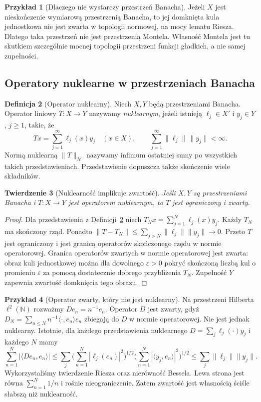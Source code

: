 \documentclass[11pt,a4paper]{article}
\numberwithin{equation}{section}
\theoremstyle{plain}
\newtheorem{twierdzenie}{Twierdzenie}[section]
\theoremstyle{definition}
\newtheorem{definicja}[twierdzenie]{Definicja}
\newtheorem{przyklad}[twierdzenie]{Przykład}
\theoremstyle{remark}
\newcommand{\N}{\mathbb N}
\begin{document}
\begin{przyklad}[Dlaczego nie wystarczy przestrzeń Banacha]
\label{ex:banach-not-montel23}
Jeżeli $X$ jest nieskończenie wymiarową przestrzenią Banacha,
to jej domknięta kula jednostkowa nie jest zwarta w topologii
normowej, na mocy lematu Riesza. Dlatego taka przestrzeń
nie jest przestrzenią Montela. Własność Montela
jest tu skutkiem szczególnie mocnej topologii przestrzeni
funkcji gładkich, a nie samej zupełności.
\end{przyklad}

\subsection{Operatory nuklearne w przestrzeniach Banacha}

\begin{definicja}[Operator nuklearny]
\label{def:nuclear-banach23}
Niech $X,Y$ będą przestrzeniami Banacha. Operator liniowy
$T:X\to Y$ nazywamy \emph{nuklearnym}, jeżeli istnieją
$\ell_j\in X'$ i $y_j\in Y$, $j\ge1$, takie, że
\[
 Tx=\sum_{j=1}^\infty \ell_j(x)y_j\quad(x\in X),
 \qquad \sum_{j=1}^\infty\|\ell_j\|\,\|y_j\|<\infty.
\]
Normą nuklearną $\|T\|_{\mathcal N}$ nazywamy infimum
ostatniej sumy po wszystkich takich przedstawieniach.
Przedstawienie dopuszcza także skończenie wiele składników.
\end{definicja}

\begin{twierdzenie}[Nuklearność implikuje zwartość]
\label{thm:nuclear-compact23}
Jeśli $X,Y$ są przestrzeniami Banacha i $T:X\to Y$
jest operatorem nuklearnym, to $T$ jest ograniczony i zwarty.
\end{twierdzenie}
\begin{proof}
Dla przedstawienia z Definicji~\ref{def:nuclear-banach23}
niech $T_Nx=\sum_{j=1}^N\ell_j(x)y_j$.
Każdy $T_N$ ma skończony rząd. Ponadto
$\|T-T_N\|\le\sum_{j>N}\|\ell_j\|\|y_j\|\to0$.
Przeto $T$ jest ograniczony i jest granicą operatorów
skończonego rzędu w normie operatorowej. Granica
operatorów zwartych w normie operatorowej jest zwarta:
obraz kuli jednostkowej można dla dowolnego $\varepsilon>0$
pokryć skończoną liczbą kul o promieniu $\varepsilon$
za pomocą dostatecznie dobrego przybliżenia $T_N$.
Zupełność $Y$ zapewnia zwartość domknięcia tego obrazu.
\end{proof}

\begin{przyklad}[Operator zwarty, który nie jest nuklearny]
\label{ex:compact-nonnuclear23}
Na przestrzeni Hilberta $\ell^2(\N)$ rozważmy
$De_n=n^{-1}e_n$. Operator $D$ jest zwarty, gdyż
$D_N=\sum_{n\le N}n^{-1}\langle\cdot,e_n\rangle e_n$
zbiegają do $D$ w normie operatorowej. Nie jest jednak
nuklearny. Istotnie, dla każdego przedstawienia nuklearnego
$D=\sum_j\ell_j(\cdot)y_j$ i każdego $N$ mamy
\[
\sum_{n=1}^N|\langle De_n,e_n\rangle|
\le\sum_j
\Big(\sum_{n=1}^N|\ell_j(e_n)|^2\Big)^{1/2}
\Big(\sum_{n=1}^N|\langle y_j,e_n\rangle|^2\Big)^{1/2}
\le\sum_j\|\ell_j\|\|y_j\|.
\]
Wykorzystaliśmy twierdzenie Riesza oraz nierówność Bessela.
Lewa strona jest równa $\sum_{n=1}^N1/n$ i rośnie
nieograniczenie. Zatem zwartość jest własnością ściśle
słabszą niż nuklearność.
\end{przyklad}
\end{document}
